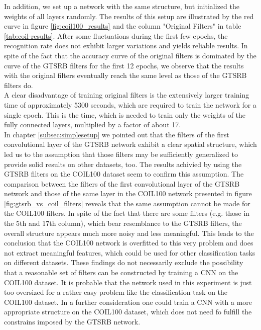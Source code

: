 \documentclass[11pt, a4paper]{article}
\begin{document}
In addition, we set up a network with the same structure, but initialized the weights of all layers randomly. The results of this setup are illustrated by the red curve in figure \ref{fig:coil100_results} and the column "Original Filters" in table \ref{tab:coil-results}. After some fluctuations during the first few epochs, the recognition rate does not exhibit larger variations and yields reliable results. In spite of the fact that the accuracy curve of the original filters is dominated by the curve of the GTSRB filters for the first 12 epochs, we observe that the results with the original filters eventually reach the same level as those of the GTSRB filters do.\\
A clear disadvantage of training original filters is the extensively larger training time of approximately 5300 seconds, which are required to train the network for a single epoch. This is the time, which is needed to train only the weights of the fully connected layers, multiplied by a factor of about 17.\\
In chapter \ref{subsec:simplesetup} we pointed out that the filters of the first convolutional layer of the GTSRB network exhibit a clear spatial structure, which led us to the assumption that those filters may be sufficiently generalized to provide solid results on other datasets, too. The results achivied by using the GTSRB filters on the COIL100 dataset seem to confirm this assumption. The comparison between the filters of the first convolutional layer of the GTSRB network and those of the same layer in the COIL100 network presented in figure \ref{fig:gtsrb_vs_coil_filters} reveals that the same assumption cannot be made for the COIL100 filters. In spite of the fact that there are some filters (e.g. those in the 5th and 17th column), which bear resemblance to the GTSRB filters, the overall structure appears much more noisy and less meaningful. This leads to the conclusion that the COIL100 network is overfitted to this very problem and does not extract meaningful features, which could be used for other classification tasks on different datasets. These findings do not necessarily exclude the possibility that a reasonable set of filters can be constructed by training a CNN on the COIL100 dataset. It is probable that the network used in this experiment is just too oversized for a rather easy problem like the classification task on the COIL100 dataset. In a further consideration one could train a CNN with a more appropriate structure on the COIL100 dataset, which does not need fo fulfill the constrains imposed by the GTSRB network. 
\end{document}
